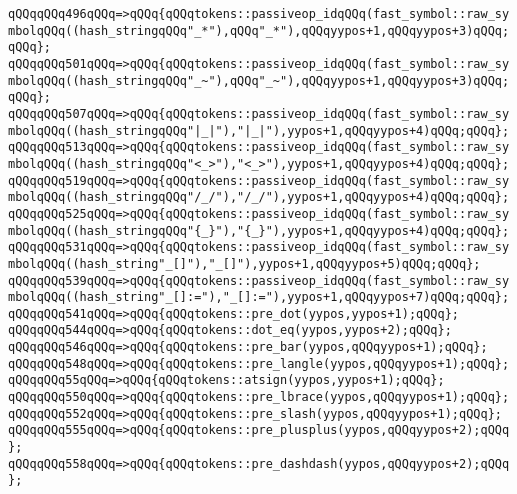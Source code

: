 \verb|qQQqqQQq496qQQq=>qQQq{qQQqtokens::passiveop_idqQQq(fast_symbol::raw_symbolqQQq((hash_stringqQQq"_*"),qQQq"_*"),qQQqyypos+1,qQQqyypos+3)qQQq;qQQq};|\newline
\verb|qQQqqQQq501qQQq=>qQQq{qQQqtokens::passiveop_idqQQq(fast_symbol::raw_symbolqQQq((hash_stringqQQq"_~"),qQQq"_~"),qQQqyypos+1,qQQqyypos+3)qQQq;qQQq};|\newline
\verb|qQQqqQQq507qQQq=>qQQq{qQQqtokens::passiveop_idqQQq(fast_symbol::raw_symbolqQQq((hash_stringqQQq"|\verb#|_|"),"|_|"),yypos+1,qQQqyypos+4)qQQq;qQQq};#\newline
\verb|qQQqqQQq513qQQq=>qQQq{qQQqtokens::passiveop_idqQQq(fast_symbol::raw_symbolqQQq((hash_stringqQQq"<_>"),"<_>"),yypos+1,qQQqyypos+4)qQQq;qQQq};|\newline
\verb|qQQqqQQq519qQQq=>qQQq{qQQqtokens::passiveop_idqQQq(fast_symbol::raw_symbolqQQq((hash_stringqQQq"/_/"),"/_/"),yypos+1,qQQqyypos+4)qQQq;qQQq};|\newline
\verb|qQQqqQQq525qQQq=>qQQq{qQQqtokens::passiveop_idqQQq(fast_symbol::raw_symbolqQQq((hash_stringqQQq"{_}"),"{_}"),yypos+1,qQQqyypos+4)qQQq;qQQq};|\newline
\verb|qQQqqQQq531qQQq=>qQQq{qQQqtokens::passiveop_idqQQq(fast_symbol::raw_symbolqQQq((hash_string"_[]"),"_[]"),yypos+1,qQQqyypos+5)qQQq;qQQq};|\newline
\verb|qQQqqQQq539qQQq=>qQQq{qQQqtokens::passiveop_idqQQq(fast_symbol::raw_symbolqQQq((hash_string"_[]:="),"_[]:="),yypos+1,qQQqyypos+7)qQQq;qQQq};|\newline
\verb|qQQqqQQq541qQQq=>qQQq{qQQqtokens::pre_dot(yypos,yypos+1);qQQq};|\newline
\verb|qQQqqQQq544qQQq=>qQQq{qQQqtokens::dot_eq(yypos,yypos+2);qQQq};|\newline
\verb|qQQqqQQq546qQQq=>qQQq{qQQqtokens::pre_bar(yypos,qQQqyypos+1);qQQq};|\newline
\verb|qQQqqQQq548qQQq=>qQQq{qQQqtokens::pre_langle(yypos,qQQqyypos+1);qQQq};|\newline
\verb|qQQqqQQq55qQQq=>qQQq{qQQqtokens::atsign(yypos,yypos+1);qQQq};|\newline
\verb|qQQqqQQq550qQQq=>qQQq{qQQqtokens::pre_lbrace(yypos,qQQqyypos+1);qQQq};|\newline
\verb|qQQqqQQq552qQQq=>qQQq{qQQqtokens::pre_slash(yypos,qQQqyypos+1);qQQq};|\newline
\verb|qQQqqQQq555qQQq=>qQQq{qQQqtokens::pre_plusplus(yypos,qQQqyypos+2);qQQq};|\newline
\verb|qQQqqQQq558qQQq=>qQQq{qQQqtokens::pre_dashdash(yypos,qQQqyypos+2);qQQq};|\newline

